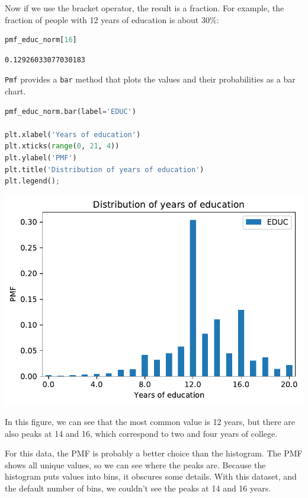Now if we use the bracket operator, the result is a fraction. For
example, the fraction of people with 12 years of education is about
30\%:

\begin{lstlisting}[language=Python]
pmf_educ_norm[16]
\end{lstlisting}

\begin{lstlisting}[]
0.12926033077030183
\end{lstlisting}

\passthrough{\lstinline!Pmf!} provides a \passthrough{\lstinline!bar!}
method that plots the values and their probabilities as a bar chart.

\begin{lstlisting}[language=Python]
pmf_educ_norm.bar(label='EDUC')

plt.xlabel('Years of education')
plt.xticks(range(0, 21, 4))
plt.ylabel('PMF')
plt.title('Distribution of years of education')
plt.legend();
\end{lstlisting}

\begin{center}
\includegraphics[scale=0.75]{chapters/08_distributions_files/08_distributions_50_0.pdf}
\end{center}

In this figure, we can see that the most common value is 12 years, but
there are also peaks at 14 and 16, which correspond to two and four
years of college.

For this data, the PMF is probably a better choice than the histogram.
The PMF shows all unique values, so we can see where the peaks are.
Because the histogram puts values into bins, it obscures some details.
With this dataset, and the default number of bins, we couldn't see the
peaks at 14 and 16 years.

